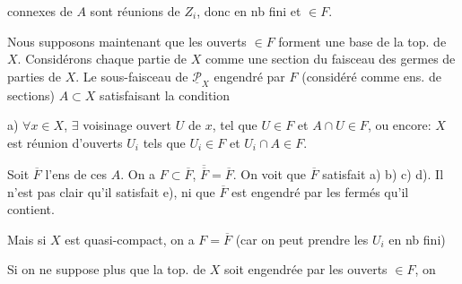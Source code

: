 connexes de $A$ sont réunions de $Z_i$, donc en nb fini et $\in F$.

Nous supposons maintenant que les ouverts $\in F$ forment une base de la top. de $X$. Considérons chaque partie de $X$ comme une section du faisceau  des germes de parties de $X$. Le sous-faisceau  de $\underline{\mathcal P}_X$ engendré par $F$ (considéré comme ens. de sections)   $A\subset X$ satisfaisant la condition

a) $\forall x\in X$, $\exists$ voisinage ouvert $U$ de $x$, tel que $U\in F$ et $A\cap U\in F$, ou encore: $X$ est réunion d'ouverts $U_i$ tels que $U_i\in F$ et $U_i\cap A\in F$.

Soit $\overline F$ l'ens de ces $A$. On a $F\subset\overline F$, $\overline{\overline F}=\overline F$. On voit que $\overline F$ satisfait a) b) c) d).  Il n'est pas clair qu'il satisfait e),  ni que $\overline F$ est engendré par les fermés qu'il contient.

Mais si $X$ est quasi-compact, on a $F=\overline F$ (car on peut prendre les $U_i$ en nb fini)

Si on ne suppose plus que la top. de $X$ soit engendrée par les ouverts $\in F$, on
